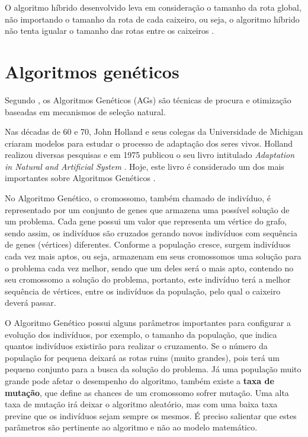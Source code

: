 \documentclass{abnt}
\begin{document}
		O algoritmo híbrido desenvolvido leva em consideração o tamanho da rota global, não importando o tamanho da rota de cada caixeiro, ou seja, o algoritmo híbrido não tenta igualar o tamanho das rotas entre os caixeiros  \cite{dissertation}.
	
	\chapter{Algoritmos genéticos}

		Segundo , os Algoritmos Genéticos (AGs) são técnicas de procura e otimização baseadas em mecanismos de seleção natural. 

		Nas décadas de 60 e 70, John Holland e seus colegas da Universidade de Michigan criaram modelos para estudar o processo de adaptação dos seres vivos. Holland realizou diversas pesquisas e em 1975 publicou o seu livro intitulado \textit{Adaptation in Natural and Artificial System} \cite{john}. Hoje, este livro é considerado um dos mais importantes sobre Algoritmos Genéticos \cite{0001-pdf}.

		No Algoritmo Genético, o cromossomo, também chamado de indivíduo, é representado por um conjunto de genes que armazena uma possível solução de um problema. Cada gene possui um valor que representa um vértice do grafo, sendo assim, os indivíduos são cruzados gerando novos indivíduos com sequência de genes (vértices) diferentes. Conforme a população cresce, surgem indivíduos cada vez mais aptos, ou seja, armazenam em seus cromossomos uma solução para o problema cada vez melhor, sendo que um deles será o mais apto, contendo no seu cromossomo a solução do problema, portanto, este indivíduo terá a melhor sequência de vértices, entre os indivíduos da população, pelo qual o caixeiro deverá passar.

		O Algoritmo Genético possui alguns parâmetros importantes para configurar a evolução dos indivíduos, por exemplo, o tamanho da população, que indica quantos indivíduos existirão para realizar o cruzamento. Se o número da população for pequena deixará as rotas ruins (muito grandes), pois terá um pequeno conjunto para a busca da solução do problema. Já uma população muito grande pode afetar o desempenho do algoritmo, também  existe a \textbf{taxa de mutação}, que define as chances de um cromossomo sofrer mutação. Uma alta taxa de mutação irá deixar o algoritmo aleatório, mas com uma baixa taxa previne que os indivíduos sejam sempre os mesmos. É preciso salientar que estes parâmetros são pertinente ao algoritmo e não ao modelo matemático.
\end{document}
